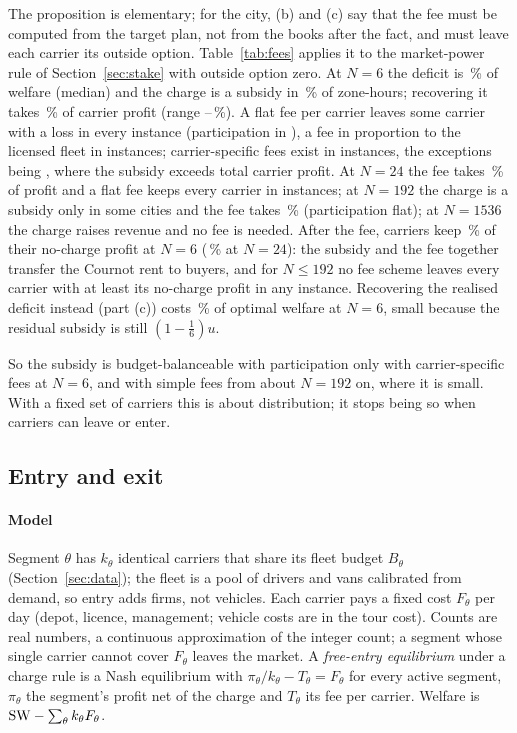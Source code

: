 The proposition is elementary; for the city, (b) and (c) say that the fee must be computed from the target plan, not from the books after the fact, and must leave each carrier its outside option. Table~\ref{tab:fees} applies it to the market-power rule of Section~\ref{sec:stake} with outside option zero. At $N=6$ the deficit is \FeeSixDef\,\% of welfare (median) and the charge is a subsidy in \FeeSixSub\,\% of zone-hours; recovering it takes \FeeSixShare\,\% of carrier profit (range \FeeSixShareMin--\FeeSixShareMax\,\%). A flat fee per carrier leaves some carrier with a loss in every instance (participation in \FeeSixFlatOK), a fee in proportion to the licensed fleet in \FeeSixFleetOK{} instances; carrier-specific fees exist in \FeeSixAggregateOK{} instances, the exceptions being \FeeAggFailCities, where the subsidy exceeds total carrier profit. At $N=24$ the fee takes \FeeTwentyFourShare\,\% of profit and a flat fee keeps every carrier in \FeeTwentyFourFlatOK{} instances; at $N=192$ the charge is a subsidy only in some cities and the fee takes \FeeOneNinetyTwoShare\,\% (participation \FeeOneNinetyTwoFlatOK{} flat); at $N=1536$ the charge raises revenue and no fee is needed. After the fee, carriers keep \FeeSixKept\,\% of their no-charge profit at $N=6$ (\FeeTwentyFourKept\,\% at $N=24$): the subsidy and the fee together transfer the Cournot rent to buyers, and for $N\le192$ no fee scheme leaves every carrier with at least its no-charge profit in any instance. Recovering the realised deficit instead (part (c)) costs \FeeSixEpLoss\,\% of optimal welfare at $N=6$, small because the residual subsidy is still $(1-\tfrac16)u$.



So the subsidy is budget-balanceable with participation only with carrier-specific fees at $N=6$, and with simple fees from about $N=192$ on, where it is small. With a fixed set of carriers this is about distribution; it stops being so when carriers can leave or enter.

\subsection{Entry and exit}\label{sec:entry}
\paragraph{Model} Segment $\theta$ has $k_\theta$ identical carriers that share its fleet budget $B_\theta$ (Section~\ref{sec:data}); the fleet is a pool of drivers and vans calibrated from demand, so entry adds firms, not vehicles. Each carrier pays a fixed cost $F_\theta$ per day (depot, licence, management; vehicle costs are in the tour cost). Counts are real numbers, a continuous approximation of the integer count; a segment whose single carrier cannot cover $F_\theta$ leaves the market. A \emph{free-entry equilibrium} under a charge rule is a Nash equilibrium with $\pi_\theta/k_\theta-T_\theta=F_\theta$ for every active segment, $\pi_\theta$ the segment's profit net of the charge and $T_\theta$ its fee per carrier. Welfare is $\mathrm{SW}-\sum_\theta k_\theta F_\theta$.

